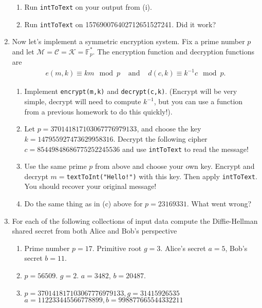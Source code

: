 \documentclass[11pt]{article}
\newcommand{\bF}{\mathbb{F}}
\newcommand{\cC}{\mathcal{C}}
\newcommand{\cK}{\mathcal{K}}
\newcommand{\cM}{\mathcal{M}}
\begin{document}
\begin{enumerate}
{\begin{enumerate}
{\begin{enumerate}
      \item{Run \verb|intToText| on your output from (i).}
      \item{Run \verb|intToText| on 157690076402712651527241.  Did it work?}
    \end{enumerate}
    }
  \end{enumerate}
  }
  \item{
  Now let's implement a symmetric encryption system.  Fix a prime number $p$ and let $\cM = \cC = \cK = \bF_p^*$.  The encryption function and decryption functions are
  \begin{eqnarray*}
    e(m,k)\equiv km\mod p&\text{    and    }&d(c,k)\equiv k^{-1}c\mod p.
  \end{eqnarray*}
  \begin{enumerate}
    \item{
    Implement \verb|encrypt(m,k)| and \verb|decrypt(c,k)|.  (Encrypt will be very simple, decrypt will need to compute $k^{-1}$, but you can use a function from a previous homework to do this quickly!).
    }
    \item{
     Let $p = 370141817103067776979133$, and choose the key $k=147955927473629958316$.  Decrypt the following cipher $c=85449848686775252245536$ and use \verb|intToText| to read the message!
    }
    \item{
    Use the same prime $p$ from above and choose your own key.  Encrypt and decrypt $m=$\verb|textToInt("Hello!")| with this key.  Then apply \verb|intToText|.  You should recover your original message!
    }
    \item{
    Do the same thing as in (c) above for $p=23169331$.  What went wrong?
    }
  \end{enumerate}
  }
  \item{For each of the following collections of input data compute the Diffie-Hellman shared secret from both Alice and Bob's perspective
  \begin{enumerate}
    \item{
    Prime number $p = 17$.  Primitive root $g=3$.  Alice's secret $a=5$, Bob's secret $b = 11$.
    }
    \item{
    $p = 56509$.  $g=2$. $a = 3482$, $b=20487$.
    }
    \item{
    $p = 370141817103067776979133,g=31415926535$\\
    $a = 112233445566778899,b=998877665544332211$
    }
  \end{enumerate}
  }
\end{enumerate}
\end{document}
